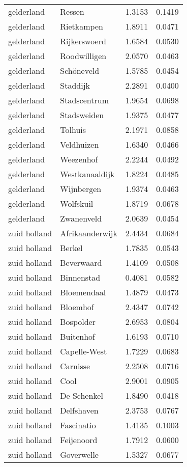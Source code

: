 \begin{longtable}{llcc}
gelderland & Ressen & 1.3153 & 0.1419 \\
gelderland & Rietkampen & 1.8911 & 0.0471 \\
gelderland & Rijkerswoerd & 1.6584 & 0.0530 \\
gelderland & Roodwilligen & 2.0570 & 0.0463 \\
gelderland & Schöneveld & 1.5785 & 0.0454 \\
gelderland & Staddijk & 2.2891 & 0.0400 \\
gelderland & Stadscentrum & 1.9654 & 0.0698 \\
gelderland & Stadsweiden & 1.9375 & 0.0477 \\
gelderland & Tolhuis & 2.1971 & 0.0858 \\
gelderland & Veldhuizen & 1.6340 & 0.0466 \\
gelderland & Weezenhof & 2.2244 & 0.0492 \\
gelderland & Westkanaaldijk & 1.8224 & 0.0485 \\
gelderland & Wijnbergen & 1.9374 & 0.0463 \\
gelderland & Wolfskuil & 1.8719 & 0.0678 \\
gelderland & Zwanenveld & 2.0639 & 0.0454 \\
zuid holland & Afrikaanderwijk & 2.4434 & 0.0684 \\
zuid holland & Berkel & 1.7835 & 0.0543 \\
zuid holland & Beverwaard & 1.4109 & 0.0508 \\
zuid holland & Binnenstad & 0.4081 & 0.0582 \\
zuid holland & Bloemendaal & 1.4879 & 0.0473 \\
zuid holland & Bloemhof & 2.4347 & 0.0742 \\
zuid holland & Bospolder & 2.6953 & 0.0804 \\
zuid holland & Buitenhof & 1.6193 & 0.0710 \\
zuid holland & Capelle-West & 1.7229 & 0.0683 \\
zuid holland & Carnisse & 2.2508 & 0.0716 \\
zuid holland & Cool & 2.9001 & 0.0905 \\
zuid holland & De Schenkel & 1.8490 & 0.0418 \\
zuid holland & Delfshaven & 2.3753 & 0.0767 \\
zuid holland & Fascinatio & 1.4135 & 0.1003 \\
zuid holland & Feijenoord & 1.7912 & 0.0600 \\
zuid holland & Goverwelle & 1.5327 & 0.0677 \\

\end{longtable}
